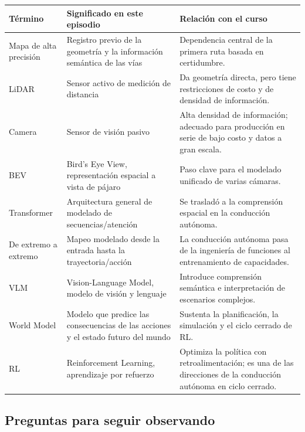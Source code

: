 \noindent\begin{tabularx}{\textwidth}{p{}p{}X}
\toprule
Término & Significado en este episodio & Relación con el curso \\
\midrule
Mapa de alta precisión & Registro previo de la geometría y la información semántica de las vías & Dependencia central de la primera ruta basada en certidumbre. \\
LiDAR & Sensor activo de medición de distancia & Da geometría directa, pero tiene restricciones de costo y de densidad de información. \\
Camera & Sensor de visión pasivo & Alta densidad de información; adecuado para producción en serie de bajo costo y datos a gran escala. \\
BEV & Bird's Eye View, representación espacial a vista de pájaro & Paso clave para el modelado unificado de varias cámaras. \\
Transformer & Arquitectura general de modelado de secuencias/atención & Se trasladó a la comprensión espacial en la conducción autónoma. \\
De extremo a extremo & Mapeo modelado desde la entrada hasta la trayectoria/acción & La conducción autónoma pasa de la ingeniería de funciones al entrenamiento de capacidades. \\
VLM & Vision-Language Model, modelo de visión y lenguaje & Introduce comprensión semántica e interpretación de escenarios complejos. \\
World Model & Modelo que predice las consecuencias de las acciones y el estado futuro del mundo & Sustenta la planificación, la simulación y el ciclo cerrado de RL. \\
RL & Reinforcement Learning, aprendizaje por refuerzo & Optimiza la política con retroalimentación; es una de las direcciones de la conducción autónoma en ciclo cerrado. \\
\bottomrule
\end{tabularx}

\subsection{Preguntas para seguir observando}


